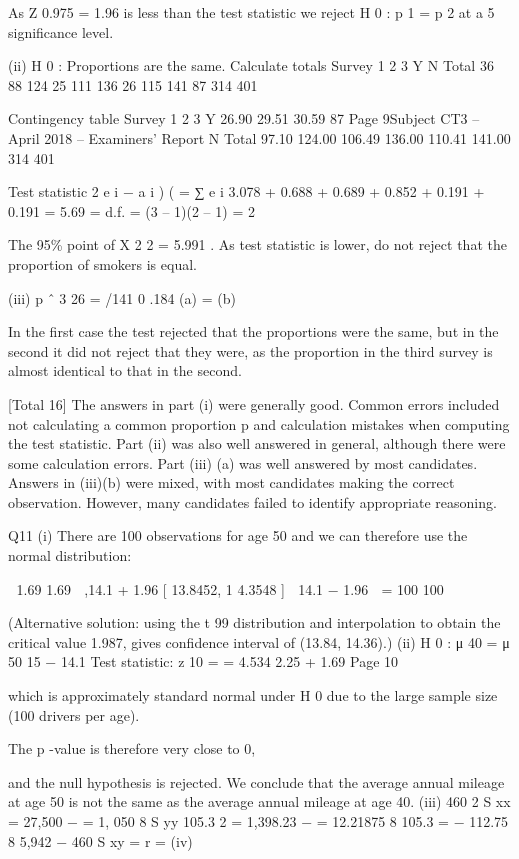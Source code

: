 \documentclass[a4paper,12pt]{article}
\begin{document}
\begin{enumerate}
As Z 0.975 = 1.96 is less than the test statistic we reject H 0 : p 1 = p 2 at a 5%
significance level.

(ii)
H 0 : Proportions are the same.
Calculate totals
Survey 1 2 3
Y
N
Total 36
88
124 25
111
136 26
115
141
87
314
401

Contingency table
Survey 1 2 3
Y 26.90 29.51 30.59
87
Page 9Subject CT3  – April 2018 – Examiners’ Report
N
Total
97.10
124.00
106.49
136.00
110.41
141.00
314
401

Test statistic
2
e i − a i )
(
=
∑
e i
3.078 + 0.688 + 0.689 + 0.852 + 0.191 + 0.191 =
5.69
=
d.f. = (3 – 1)(2 – 1) = 2


The 95\%  point of X 2 2 = 5.991 . As test statistic is lower, do not reject that the
proportion of smokers is equal.

(iii)
p ˆ 3 26
=
/141 0 .184
(a) =
(b)

In the first case the test rejected that the proportions were the same, but
in the second it did not reject that they were, as the proportion in the
third survey is almost identical to that in the second.

[Total 16]
The answers in part (i) were generally good. Common errors included not calculating a common proportion p and calculation mistakes when
computing the test statistic. Part (ii) was also well answered in general, although there were some calculation errors. Part (iii) (a) was well
answered by most candidates. Answers in (iii)(b) were mixed, with most candidates making the correct observation. However, many candidates
failed to identify appropriate reasoning.

Q11
(i)
There are 100 observations for age 50 and we can therefore use the normal distribution:


1.69
1.69 
,14.1 + 1.96
[ 13.8452, 1 4.3548 ]
 14.1 − 1.96
 =
100
100



(Alternative solution: using the t 99 distribution and interpolation to obtain the
critical value 1.987, gives confidence interval of (13.84, 14.36).)
(ii)
H 0 : μ 40 =
μ 50
15 − 14.1
Test
statistic: z 10
=
= 4.534
2.25 + 1.69
Page 10

which is approximately standard normal under H 0 due to the large sample
size (100 drivers per age).

The p -value is therefore very close to 0,

and the null hypothesis is rejected. We conclude that the average annual
mileage at age 50 is not the same as the average annual mileage at age 40. 
(iii)
460 2
S xx = 27,500 −
= 1, 050
8
S yy
105.3 2
= 1,398.23 −
= 12.21875
8 
105.3
=
− 112.75
8 
5,942 − 460
S xy =
r =
(iv)


\end{enumerate}
\end{document}
